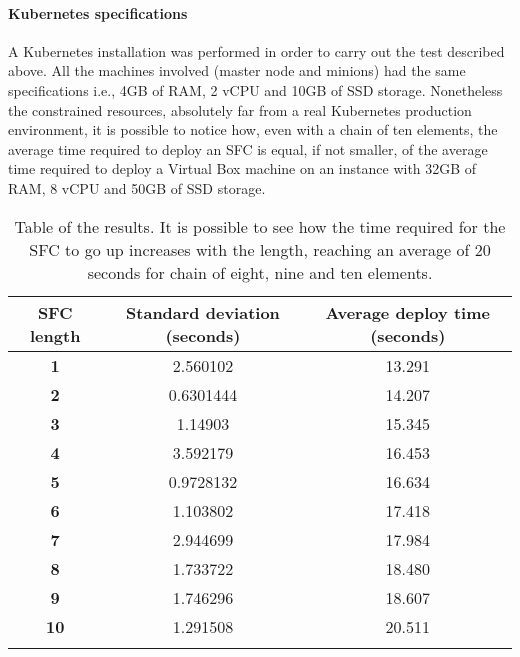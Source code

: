 \paragraph*{Kubernetes specifications}
A Kubernetes installation was performed in order to carry out the test
described above. All the machines involved (master node and minions) had the
same specifications i.e., 4GB of RAM, 2 vCPU and 10GB of SSD storage.
Nonetheless the constrained resources, absolutely far from a real Kubernetes
production environment, it is possible to notice how, even with a chain of ten
elements, the average time required to deploy an SFC is equal, if not smaller,
of the average time required to deploy a Virtual Box machine on an instance 
with 32GB of RAM, 8 vCPU and 50GB of SSD storage.

\newpage

\begin{longtable}[c]{c|c|c}
\textbf{SFC length} & \textbf{Standard deviation (seconds)} & \textbf{Average 
deploy time (seconds)} \\ \hline
\endhead
%
\textbf{1}          & 2.560102                   & 13.291                     \\
\textbf{2}          & 0.6301444                  & 14.207                     \\
\textbf{3}          & 1.14903                    & 15.345                     \\
\textbf{4}          & 3.592179                   & 16.453                     \\
\textbf{5}          & 0.9728132                  & 16.634                     \\
\textbf{6}          & 1.103802                   & 17.418                     \\
\textbf{7}          & 2.944699                   & 17.984                     \\
\textbf{8}          & 1.733722                   & 18.480                     \\
\textbf{9}          & 1.746296                   & 18.607                     \\
\textbf{10}         & 1.291508                   & 20.511                     \\
\caption[SFC start up time]{Table of the results. It is possible to see how the
  time required for the SFC to go up increases with the length, reaching an
  average of 20 seconds for chain of eight, nine and ten elements.}
\label{chap:tests:sec:sfclength:tab:sfcdata}\\

\end{longtable}


